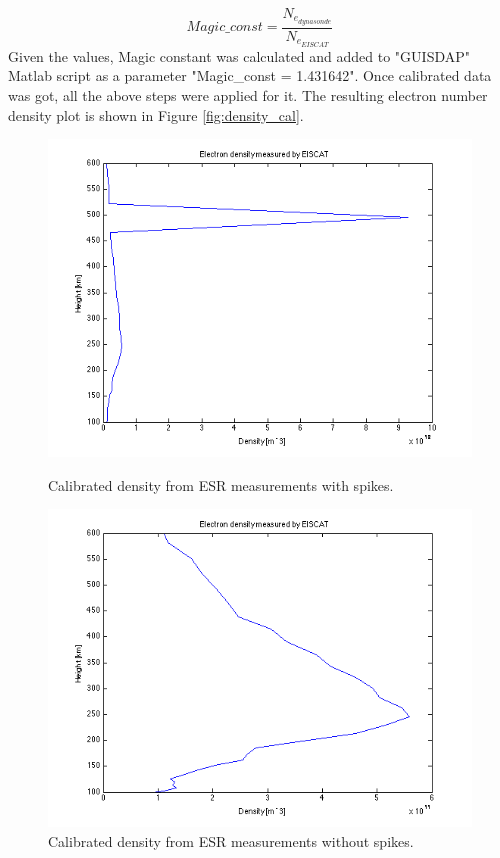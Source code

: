 \documentclass{article}
\begin{document}
\begin{equation}
\label{eq:mag_cnst}
Magic\_const=\frac{N_{e_{dynasonde}}}{N_{e_{EISCAT}}}
\end{equation}
Given the values, Magic constant was calculated and added to "GUISDAP" Matlab script as a parameter "Magic\_const = 1.431642". Once calibrated data was got, all the above steps were applied for it. The resulting electron number density plot is shown in Figure \ref{fig:density_cal}.
\begin{figure}[h!tb]
		\centering
	\begin{minipage}[t]{0.45\linewidth}
		\includegraphics[width=\textwidth]{Figures/density_cal.png}
		\caption{Calibrated density from ESR measurements with spikes.}
		\label{fig:density_cal}
	\end{minipage}
	\begin{minipage}[t]{0.45\linewidth}
		\includegraphics[width=\textwidth]{Figures/density_cal_no_spikes.png}
		\caption{Calibrated density from ESR measurements without spikes.}
		\label{fig:density_cal_no_spikes}
	\end{minipage}
\end{figure}
\end{document}
